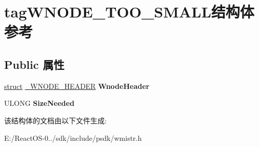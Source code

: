 \hypertarget{structtag_w_n_o_d_e___t_o_o___s_m_a_l_l}{}\section{tag\+W\+N\+O\+D\+E\+\_\+\+T\+O\+O\+\_\+\+S\+M\+A\+L\+L结构体 参考}
\label{structtag_w_n_o_d_e___t_o_o___s_m_a_l_l}
\subsection*{Public 属性}
\begin{DoxyCompactItemize}
\item 
\mbox{\label{structtag_w_n_o_d_e___t_o_o___s_m_a_l_l_a3fa75b84d1fd60f18243eff97b0a4653}} 
\hyperlink{interfacestruct}{struct} \hyperlink{struct___w_n_o_d_e___h_e_a_d_e_r}{\+\_\+\+W\+N\+O\+D\+E\+\_\+\+H\+E\+A\+D\+ER} {\bfseries Wnode\+Header}
\item 
\mbox{\label{structtag_w_n_o_d_e___t_o_o___s_m_a_l_l_a85999c8242526178f0096285729a8bda}} 
U\+L\+O\+NG {\bfseries Size\+Needed}
\end{DoxyCompactItemize}


该结构体的文档由以下文件生成\+:\begin{DoxyCompactItemize}
\item 
E\+:/\+React\+O\+S-\/0../sdk/include/psdk/wmistr.\+h\end{DoxyCompactItemize}
